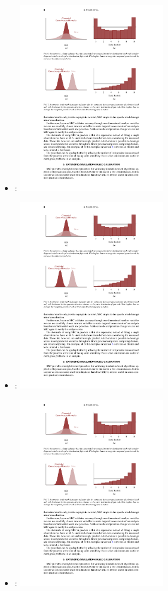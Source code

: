 \documentclass[10pt]{report}
\begin{document}
\begin{itemize}
  \item 
    : \hfill
    \includegraphics[valign=c,width=0.5\textwidth]{img/sbc-over.pdf}
  \item 
    : \hfill
    \includegraphics[valign=c,width=0.5\textwidth]{img/sbc-under.pdf}
  \item 
    : \hfill
    \includegraphics[valign=c,width=0.5\textwidth]{img/sbc-skew.pdf}
\end{itemize}
\end{document}
